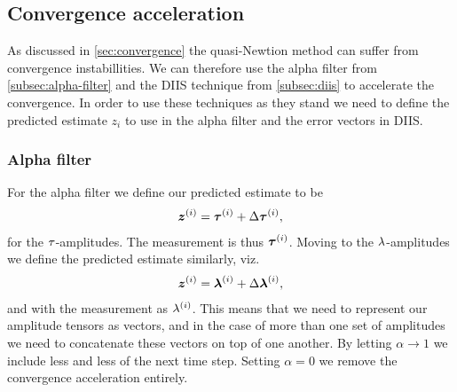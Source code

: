         \subsection{Convergence acceleration}
            As discussed in \autoref{sec:convergence} the quasi-Newtion method
            can suffer from convergence instabillities.
            We can therefore use the alpha filter from
            \autoref{subsec:alpha-filter} and the DIIS technique from
            \autoref{subsec:diis} to accelerate the convergence.
            In order to use these techniques as they stand we need to define the
            predicted estimate $z_i$ to use in the alpha filter and the error
            vectors in DIIS.

            \subsubsection{Alpha filter}
                For the alpha filter we define our predicted estimate to be
                \begin{align}
                    \boldsymbol{z}^{(i)} = \boldsymbol{\tau}^{(i)}
                    + \Delta\boldsymbol{\tau}^{(i)},
                \end{align}
                for the $\tau$-amplitudes.
                The measurement is thus $\boldsymbol{\tau}^{(i)}$.
                Moving to the $\lambda$-amplitudes we define the predicted
                estimate similarly, viz.
                \begin{align}
                    \boldsymbol{z}^{(i)} = \boldsymbol{\lambda}^{(i)}
                    + \Delta\boldsymbol{\lambda}^{(i)},
                \end{align}
                and with the measurement as $\lambda^{(i)}$.
                This means that we need to represent our amplitude tensors as
                vectors, and in the case of more than one set of amplitudes we
                need to concatenate these vectors on top of one another.
                By letting $\alpha \to 1$ we include less and less of the next
                time step.
                Setting $\alpha = 0$ we remove the convergence acceleration
                entirely.

